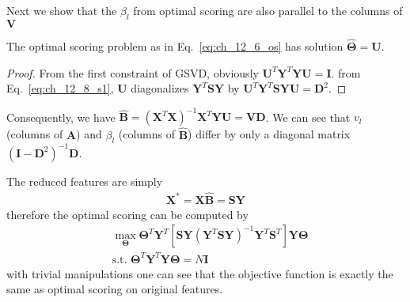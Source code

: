 \begin{exercise}
  Next we show that the $\beta_l$ from optimal scoring are also parallel to the
  columns of $\mathbf{V}$
  \begin{proposition}
    The optimal scoring problem as in Eq.~\eqref{eq:ch_12_6_os} has solution
    $\hat{\mathbf{\Theta}} = \mathbf{U}$.
  \end{proposition}
  \begin{proof}
    From the first constraint of GSVD, obviously
    $\mathbf{U}^T\mathbf{Y}^T\mathbf{YU}=\mathbf{I}$. from
    Eq.~\eqref{eq:ch_12_8_s1}, $\mathbf{U}$ diagonalizes
    $\mathbf{Y}^T\mathbf{SY}$ by $\mathbf{U}^T\mathbf{Y}^T\mathbf{SY}
    \mathbf{U} = \mathbf{D}^2$.
  \end{proof}
  Consequently, we have $\hat{\mathbf{B}} =
  (\mathbf{X}^T\mathbf{X})^{-1}\mathbf{X}^T\mathbf{YU} = \mathbf{VD}$. We can
  see that $v_l$ (columns of $\hat{\mathbf{A}}$) and $\beta_l$ (columns of
  $\hat{\mathbf{B}}$) differ by only a diagonal matrix $(\mathbf{I} -
  \mathbf{D}^2)^{-1}\mathbf{D}$.
\end{exercise}

\begin{exercise}
  The reduced features are simply
  \begin{align}
    \mathbf{X}^* = \mathbf{X}\hat{\mathbf{B}}= \mathbf{SY}
  \end{align}
  therefore the optimal scoring can be computed by 
  \begin{align}
    & \max_{\mathbf{\Theta}}\mathbf{\Theta}^T\mathbf{Y}^T
    [\mathbf{SY}(\mathbf{Y}^T\mathbf{SY})^{-1}\mathbf{Y}^T\mathbf{S}^T]
    \mathbf{Y\Theta} \\
    & \mbox{s.t. } \mathbf{\Theta}^T\mathbf{Y}^T\mathbf{Y\Theta} = N\mathbf{I}
  \end{align}
  with trivial manipulations one can see that the objective function is exactly
  the same as optimal scoring on original features.
\end{exercise}

